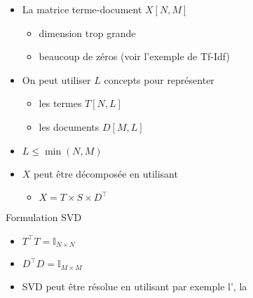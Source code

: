\documentclass{KodeBook}
\begin{document}
\begin{itemize}
	\item La matrice terme-document $X[N, M]$ 
	\begin{itemize}
		\item dimension trop grande
		\item beaucoup de zéros (voir l'exemple de Tf-Idf)
	\end{itemize}
	\item On peut utiliser $L$ concepts pour représenter
	\begin{itemize}
		\item les termes $T[N, L]$
		\item les documents $D[M, L]$
	\end{itemize}
	\item $L \le \min(N, M)$
	\item $X$ peut être décomposée en utilisant 
	\begin{itemize}
		\item $X = T \times S \times D^\top$
	\end{itemize}
\end{itemize}

Formulation SVD
\begin{itemize}
	\item $T^\top T = \mathbb{I}_{N \times N}$ 
	\item $D^\top D = \mathbb{I}_{M \times M}$ 
	\item SVD peut être résolue en utilisant par exemple l', la 
\end{itemize}
\end{document}
